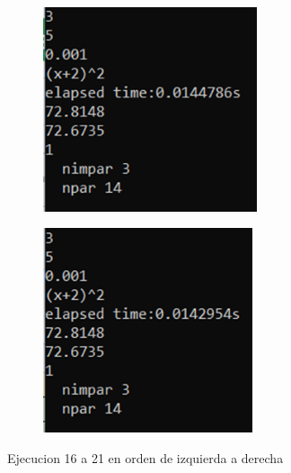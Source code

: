 \documentclass[12pt, letterpaper]{article}
\begin{document}
\begin{figure}[H]
\begin{subfigure}{0.49\textwidth}
    \end{subfigure}
    \begin{subfigure}{0.49\textwidth}
        \includegraphics[width=1\linewidth, height=6cm]{Imagen20}
    \end{subfigure}
    \begin{subfigure}{0.49\textwidth}
        \includegraphics[width=1\linewidth, height=6cm]{Imagen21}
    \end{subfigure}
    \caption{Ejecucion 16 a 21 en orden de izquierda a derecha}
\end{figure}
\end{document}
